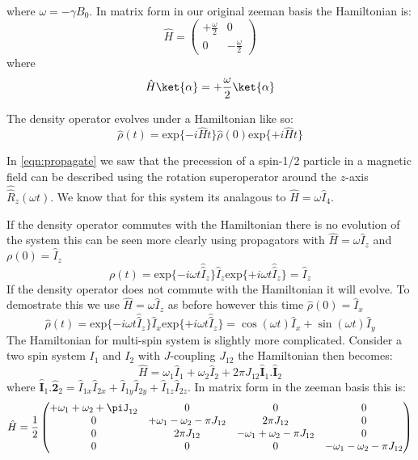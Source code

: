 where $\omega = -\gamma B_0$. In matrix form in our original zeeman basis the Hamiltonian is:
\begin{equation}
  \hat{H} = \begin{pmatrix}
+\frac{\omega}{2} & 0\\
0 & -\frac{\omega}{2}
\end{pmatrix}
\end{equation}
where
\begin{equation}
  \hat{H}\ket{\alpha} = +\frac{\omega}{2}\ket{\alpha}
\end{equation}

The density operator evolves under a Hamiltonian like so:
\begin{equation}
  \hat\rho(t) = \text{exp}\{-i\hat{H}t\}\hat\rho(0)\text{exp}\{+i\hat{H}t\}
\end{equation}

In \ref{eqn:propagate} we saw that the precession of a spin-1/2 particle in a magnetic field can be described using the rotation superoperator around the $z$-axis $\hat{\hat{R}}_z(\omega t)$. We know that for this system its analagous to $\hat{H} = \omega\hat{I}_4$.

If the density operator commutes with the Hamiltonian there is no evolution of the system
this can be seen more clearly using propagators with $\hat{H} = \omega\hat{I}_z$ and $\rho(0) = \hat{I}_z$
\begin{equation}
  \rho(t) = \text{exp}\{-i\omega t\hat{\hat{I}}_z\}\hat{I}_z\text{exp}\{+i\omega t\hat{\hat{I}}_z\} = \hat{I}_z
\end{equation}
If the density operator does not commute with the Hamiltonian it will evolve. To demostrate this we use $\hat{H} = \omega\hat{I}_z$ as before  however this time $\hat\rho(0) = \hat{I}_x$
\begin{equation}
  \hat\rho(t) = \text{exp}\{-i\omega t\hat{\hat{I}}_z\}\hat{I}_x\text{exp}\{+i\omega t\hat{\hat{I}}_z\} = \cos(\omega t)\hat{I}_x + \sin(\omega t)\hat{I}_y
\end{equation}
The Hamiltonian for multi-spin system is slightly more complicated. Consider a two spin
system $I_1$ and $I_2$ with $J$-coupling $J_{12}$ the Hamiltonian then becomes:
\begin{equation}
  \hat{H} = \omega_1\hat{I}_1 + \omega_2\hat{I}_2 + 2\pi J_{12}\hat{\mathbf{I}}_1.\hat{\mathbf{I}}_2
\end{equation}
where $\hat{\mathbf{I}}_1.\hat{\mathbf{2}}_2 = \hat{I}_{1x}\hat{I}_{2x} + \hat{I}_{1y}\hat{I}_{2y} + \hat{I}_{1z}\hat{I}_{2z}$.
In matrix form in the zeeman basis this is:
\begin{equation}
  \hat{H} = \frac{1}{2}\begin{pmatrix}
    +\omega_1 + \omega_2 + \piJ_{12} & 0 & 0 & 0\\
    0 & +\omega_1 - \omega_2 - \pi J_{12} & 2\pi J_{12} & 0\\
    0 & 2\pi J_{12} & -\omega_1 + \omega_2 - \pi J_{12} & 0\\
    0 & 0 & 0 & -\omega_1 - \omega_2 - \pi J_{12}
\end{pmatrix}
\end{equation}


